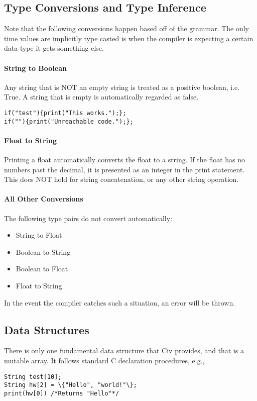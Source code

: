 \documentclass[a4paper]{article}
\begin{document}
\subsection{Type Conversions and Type Inference}
Note that the following conversions happen based off of the grammar. The only time values are implicitly type casted is when the compiler is expecting a certain data type it gets something else.

\paragraph{String to Boolean}
Any string that is NOT an empty string is treated as a positive boolean, i.e. True. A string that is empty is automatically regarded as false.
\begin{lstlisting}
if("test"){print("This works.");};
if(""){print("Unreachable code.");};
\end{lstlisting}

\paragraph{Float to String}
Printing a float automatically converts the float to a string. If the float has no numbers past the decimal, it is presented as an integer in the print statement. This does NOT hold for string concatenation, or any other string operation.

\paragraph{All Other Conversions}
The following type pairs do not convert automatically:
\begin{itemize}
\item{String to Float}
\item{Boolean to String}
\item{Boolean to Float}
\item{Float to String}.
\end{itemize}
In the event the compiler catches such a situation, an error will be thrown.

\subsection{Data Structures}
There is only one fundamental data structure that Civ provides, and that is a mutable array. It follows standard C declaration procedures, e.g.,

\begin{lstlisting}
String test[10];
String hw[2] = \{"Hello", "world!"\};
print(hw[0]) /*Returns "Hello"*/
\end{lstlisting} 
\end{document}
